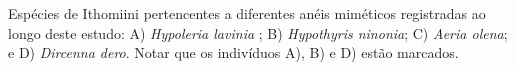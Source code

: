 \label{fig:2.1.1} Espécies de Ithomiini pertencentes a diferentes anéis miméticos registradas ao longo deste estudo: A) \textit{Hypoleria lavinia} ; B) \textit{Hypothyris ninonia}; C) \textit{Aeria olena}; e D) \textit{Dircenna dero}. Notar que os indivíduos A), B) e D) estão marcados. 
